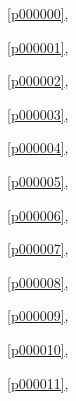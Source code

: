 ﻿



\noindent\figurename\ \ref{p000000},\ \pageref{p000000}

\noindent\figurename\ \ref{p000001},\ \pageref{p000001}

\noindent\figurename\ \ref{p000002},\ \pageref{p000002}

\noindent\figurename\ \ref{p000003},\ \pageref{p000003}

\noindent\figurename\ \ref{p000004},\ \pageref{p000004}

\noindent\figurename\ \ref{p000005},\ \pageref{p000005}

\noindent\figurename\ \ref{p000006},\ \pageref{p000006}

\noindent\figurename\ \ref{p000007},\ \pageref{p000007}

\noindent\figurename\ \ref{p000008},\ \pageref{p000008}

\noindent\figurename\ \ref{p000009},\ \pageref{p000009}

\noindent\figurename\ \ref{p000010},\ \pageref{p000010}

\noindent\figurename\ \ref{p000011},\ \pageref{p000011}









